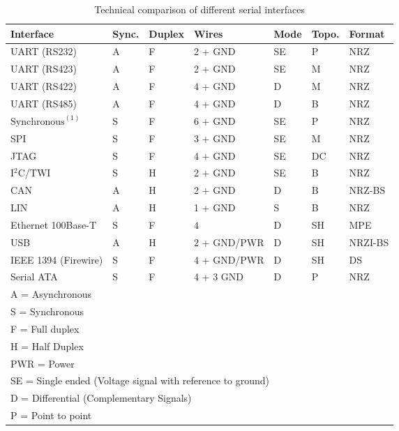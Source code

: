 \begin{table}[H]
\caption{Technical comparison of different serial interfaces}
\label{table:serial-interface}
    \begin{center}
        \begin{tabular} { | m{4cm} | m{1cm} | m{1cm} | m{2.5cm} | m{1cm} | m{1cm} | m{1.5cm} | }
        \hline
        Interface & Sync. & Duplex & Wires & Mode & Topo. & Format\\
        \hline
        UART (RS232) & A & F & 2 + GND & SE & P & NRZ\\
        UART (RS423) & A & F & 2 + GND & SE & M & NRZ\\
        UART (RS422) & A & F & 4 + GND & D & M & NRZ\\
        UART (RS485) & A & F & 4 + GND & D & B & NRZ\\
        $\textrm{Synchronous}^{(1)}$ & S & F & 6 + GND & SE & P & NRZ\\
        SPI & S & F & 3 + GND & SE & M & NRZ\\
        JTAG & S & F & 4 + GND & SE & DC & NRZ\\
        I$^2$C/TWI & S & H & 2 + GND & SE & B & NRZ\\
        CAN & A & H & 2 + GND & D & B & NRZ-BS\\
        LIN & A & H & 1 + GND & S & B & NRZ\\
        Ethernet 100Base-T & S & F & $4$ & D & SH & MPE\\
        USB & A & H & 2 + GND/PWR & D & SH & NRZI-BS\\
        IEEE 1394 {\small (Firewire)} & S & F & 4 + GND/PWR & D & SH & DS\\
        Serial ATA & S & F & 4 + 3 GND & D & P & NRZ\\
        \hline
        \multicolumn{7}{l}{A = Asynchronous}\\
        \multicolumn{7}{l}{S = Synchronous}\\
        \multicolumn{7}{l}{F = Full duplex}\\
        \multicolumn{7}{l}{H = Half Duplex}\\
        \multicolumn{7}{l}{PWR = Power}\\
        \multicolumn{7}{l}{SE = Single ended {\small (Voltage signal with reference to ground)}}\\
        \multicolumn{7}{l}{D = Differential {\small (Complementary Signals)}}\\
        \multicolumn{7}{l}{P = Point to point}\\

\end{tabular}
\end{center}
\end{table}
